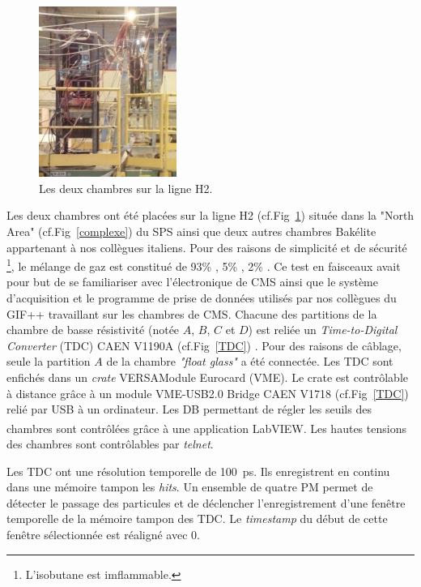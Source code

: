 \begin{figure}
	\vspace{-0.1cm}
	\centering
	\includegraphics[width=0.40\textwidth]{GLA/GCH2.png}
	\caption{Les deux chambres sur la ligne H2.}
	\label{GCH2}
\end{figure}
Les deux chambres ont été placées sur la ligne H2 (cf.Fig~\ref{GCH2}) située dans la "North Area" (cf.Fig~\ref{complexe}) du SPS ainsi que deux autres chambres Bakélite appartenant à nos collègues italiens. Pour des raisons de simplicité et de sécurité \footnote{L'isobutane est imflammable.}, le mélange de gaz est constitué de 93\% , 5\% , 2\% . Ce test en faisceaux avait pour but de se familiariser avec l'électronique de CMS ainsi que le système d'acquisition et le programme de prise de données utilisés par nos collègues du GIF++ travaillant sur les chambres de CMS. 
Chacune des partitions de la chambre de basse résistivité (notée $A$, $B$, $C$ et $D$) est reliée un \textit{Time-to-Digital Converter} (TDC) CAEN V1190A (cf.Fig~\ref{TDC}) \cite{TDC}. Pour des raisons de câblage, seule la partition $A$ de la chambre \textit{"float glass"} a été connectée. Les TDC sont enfichés dans un \textit{crate} VERSAModule Eurocard (VME). Le crate est contrôlable à distance grâce à un module VME-USB2.0 Bridge CAEN V1718 (cf.Fig~\ref{TDC}) \cite{VME} relié par USB à un ordinateur. Les DB permettant de régler les seuils des chambres sont contrôlées grâce à une application LabVIEW\textsuperscript{\textregistered}. Les hautes tensions des chambres sont contrôlables par \textit{telnet}. 

Les TDC ont une résolution temporelle de \SI{100}{\pico\second}. Ils enregistrent en continu dans une mémoire tampon les \textit{hits}. Un ensemble de quatre PM permet de détecter le passage des particules et de déclencher l'enregistrement d'une fenêtre temporelle de la mémoire tampon des TDC. Le \textit{timestamp} du début de cette fenêtre sélectionnée est réaligné avec $0$.

